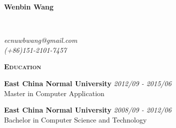 \documentclass[a4paper]{article}
\newenvironment{changemargin}[2]{%
  \begin{list}{}{%
    \setlength{\topsep}{0pt}%
    \setlength{\leftmargin}{#1}%
    \setlength{\rightmargin}{#2}%
    \setlength{\listparindent}{\parindent}%
    \setlength{\itemindent}{\parindent}%
    \setlength{\parsep}{\parskip}%
  }%
  \item[]}{\end{list}
}
\newcommand{\lineover}{
	\begin{changemargin}{-0.05in}{-0.05in}
		\vspace*{-8pt}
		\hrulefill \\
		\vspace*{-2pt}
	\end{changemargin}
}
\newcommand{\header}[1]{
	\begin{changemargin}{-0.5in}{-0.5in}
		\scshape{\textbf{#1}}\\
	\end{changemargin}
}
\newcommand{\contact}[3]{
	\begin{changemargin}{-0.5in}{-0.5in}
		{\Large \textbf{#1}}\\ \smallskip
		\lineover
		\begin{flushright}
			\emph{#2}\\ \smallskip
			\emph{#3}\smallskip
		\end{flushright}
	\end{changemargin}
}
\newenvironment{body} {
	\vspace*{-16pt}
	\begin{changemargin}{-0.5in}{-0.5in}
  }
	{\end{changemargin}
}
\begin{document}
\contact{Wenbin Wang}{ecnuwbwang@gmail.com}{(+86)151-2101-7457}

\header{Education}

\begin{body}
	\vspace{14pt}

	\textbf{East China Normal University} \hfill \emph{2012/09 - 2015/06}\\
	 Master in Computer Application\\

	\smallskip

	\textbf{East China Normal University} \hfill \emph{2008/09 - 2012/06}\\
	Bachelor in Computer Science and Technology\\
\end{body}

\medskip
\end{document}
